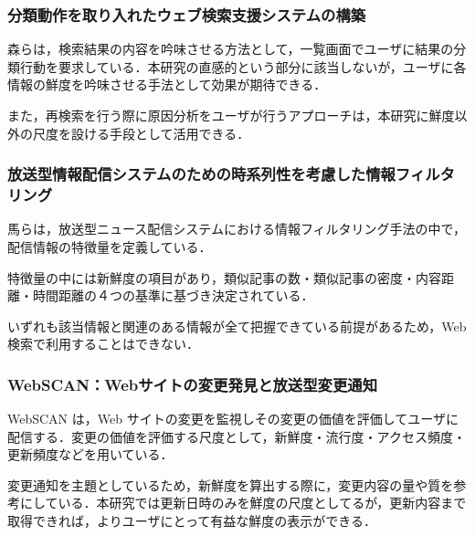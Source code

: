 \subsubsection{分類動作を取り入れたウェブ検索支援システムの構築}

森らは，検索結果の内容を吟味させる方法として，一覧画面でユーザに結果の分類行動を要求している\cite{classify}．本研究の直感的という部分に該当しないが，ユーザに各情報の鮮度を吟味させる手法として効果が期待できる．

また，再検索を行う際に原因分析をユーザが行うアプローチは，本研究に鮮度以外の尺度を設ける手段として活用できる．

\subsubsection{放送型情報配信システムのための時系列性を考慮した情報フィルタリング}

馬らは，放送型ニュース配信システムにおける情報フィルタリング手法の中で，配信情報の特徴量を定義している\cite{filtersystem}．

特徴量の中には新鮮度の項目があり，類似記事の数・類似記事の密度・内容距離・時間距離の４つの基準に基づき決定されている．

いずれも該当情報と関連のある情報が全て把握できている前提があるため，Web 検索で利用することはできない．

\subsubsection{WebSCAN：Webサイトの変更発見と放送型変更通知}

WebSCAN\cite{webscan} は，Web サイトの変更を監視しその変更の価値を評価してユーザに配信する．変更の価値を評価する尺度として，新鮮度・流行度・アクセス頻度・更新頻度などを用いている．

変更通知を主題としているため，新鮮度を算出する際に，変更内容の量や質を参考にしている．本研究では更新日時のみを鮮度の尺度としてるが，更新内容まで取得できれば，よりユーザにとって有益な鮮度の表示ができる．
